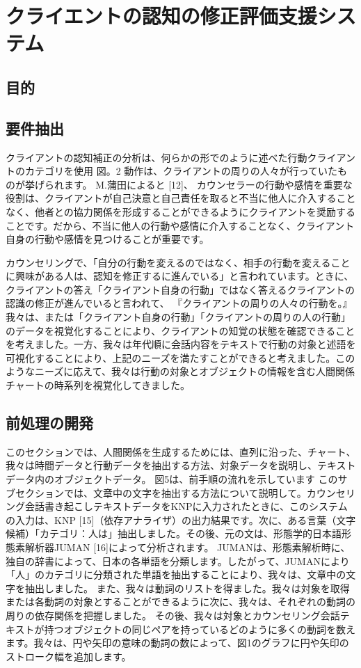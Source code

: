 \documentclass[shuuron]{kuee}
\begin{document}
\chapter{クライエントの認知の修正評価支援システム}
	\section{目的}


\section{要件抽出}

クライアントの認知補正の分析は、何らかの形でのように述べた行動クライアントのカテゴリを使用 図。2 動作は、クライアントの周りの人々が行っていたものが挙げられます。 M.蒲田によると [12]、 カウンセラーの行動や感情を重要な役割は、クライアントが自己決意と自己責任を取ると不当に他人に介入することなく、他者との協力関係を形成することができるようにクライアントを奨励することです。だから、不当に他人の行動や感情に介入することなく、クライアント自身の行動や感情を見つけることが重要です。

  カウンセリングで、「自分の行動を変えるのではなく、相手の行動を変えることに興味がある人は、認知を修正するに進んでいる」と言われています。ときに、クライアントの答え「クライアント自身の行動」ではなく答えるクライアントの認識の修正が進んでいると言われて、 『クライアントの周りの人々の行動を。』
  我々は、または「クライアント自身の行動」「クライアントの周りの人の行動」のデータを視覚化することにより、クライアントの知覚の状態を確認できることを考えました。一方、我々は年代順に会話内容をテキストで行動の対象と述語を可視化することにより、上記のニーズを満たすことができると考えました。このようなニーズに応えて、我々は行動の対象とオブジェクトの情報を含む人間関係チャートの時系列を視覚化してきました。



\section{前処理の開発}

  このセクションでは、人間関係を生成するためには、直列に沿った、チャート、我々は時間データと行動データを抽出する方法、対象データを説明し、テキストデータ内のオブジェクトデータ。 図5は、前手順の流れを示しています
  このサブセクションでは、文章中の文字を抽出する方法について説明して。カウンセリング会話書き起こしテキストデータをKNPに入力されたときに、このシステムの入力は、KNP [15]（依存アナライザ）の出力結果です。次に、ある言葉（文字候補）「カテゴリ：人は」抽出しました。その後、元の文は、形態学的日本語形態素解析器JUMAN [16]によって分析されます。 JUMANは、形態素解析時に、独自の辞書によって、日本の各単語を分類します。したがって、JUMANにより「人」のカテゴリに分類された単語を抽出することにより、我々は、文章中の文字を抽出しました。
  また、我々は動詞のリストを得ました。我々は対象を取得または各動詞の対象とすることができるように次に、我々は、それぞれの動詞の周りの依存関係を把握しました。
  その後、我々は対象とカウンセリング会話テキストが持つオブジェクトの同じペアを持っているどのように多くの動詞を数えます。我々は、円や矢印の意味の動詞の数によって、図1のグラフに円や矢印のストローク幅を追加します。
\end{document}
